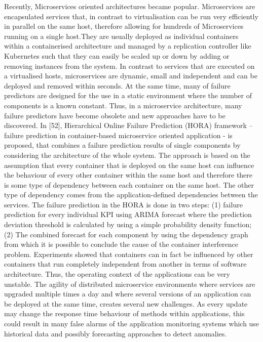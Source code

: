 \documentclass[]{usiinfprospectus}
\begin{document}
%
%
%
Recently, Microservices oriented architectures became popular. Microservices are encapsulated services that, in contrast to virtualisation can be run very efficiently in parallel on the same host, therefore allowing for hundreds of Microservices running on a single host.They are usually deployed as individual containers within a containerised architecture and managed by a replication controller like Kubernetes such that they can easily be scaled up or down by adding or removing instances from the system. In contrast to services that are executed on a virtualised hosts, microservices are dynamic, small and independent and can be deployed and removed within seconds. At the same time, many of failure predictors are designed for the use in a static environment where the number of components is a known constant. Thus, in a microservice architecture, many failure predictors have become obsolete and new approaches have to be discovered.
In [52], Hierarchical Online Failure Prediction (HORA) framework – failure prediction in container-based microservice oriented application - is proposed, that combines a failure prediction results of single components by considering the architecture of the whole system. The approach is based on the assumption that every container that is deployed on the same host can influence the behaviour of every other container within the same host and therefore there is some type of dependency between each container on the same host. The other type of dependency comes from the application-defined dependencies between the services. The failure prediction in the HORA is done in two steps: (1) failure prediction for every individual KPI using ARIMA forecast where the prediction deviation threshold is calculated by using a simple probability density function; (2) The combined forecast for each component by using the dependency graph from which it is possible to conclude the cause of the container interference problem. Experiments showed that containers can in fact be influenced by other containers that run completely independent from another in terms of software architecture. Thus, the operating context of the applications can be very unstable.
%
The agility of distributed microservice environments where services are upgraded multiple times a day and where several versions of an application can be deployed at the same time, creates several new challenges. As every update may change the response time behaviour of methods within applications, this could result in many false alarms of the application monitoring systems which use historical data and possibly forecasting approaches to detect anomalies.
\end{document}

